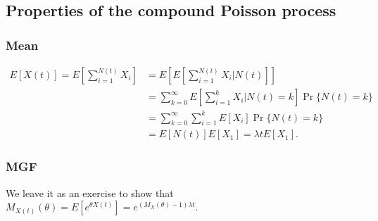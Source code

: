 \documentclass[a4paper,english,12pt]{article}
\begin{document}
\subsection{Properties of the compound Poisson process}
\subsubsection{Mean}
\begin{align*}
	E[X(t)] = E[\sum_{i=1}^{N(t)} X_i] &= E[E[\sum_{i=1}^{N(t)} X_i|N(t)]] \\
	&= \sum_{k=0}^\infty E\left[\sum_{i=1}^{k} X_i|N(t)=k\right]\Pr\{N(t) = k\}\\
	&= \sum_{k=0}^\infty \sum_{i=1}^{k} E[X_i]\Pr\{N(t) = k\}\\
	&= E[N(t)]E[X_1] = \lambda tE[X_1].
\end{align*}

\subsubsection{MGF}
We leave it as an exercise to show that $M_{X(t)}(\theta)=E[e^{\theta X(t)}] = e^{(M_X(\theta)-1)\lambda t}$.
\end{document}
